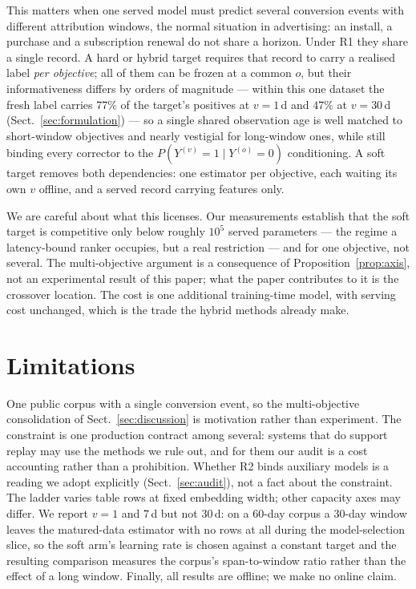 \documentclass[runningheads]{llncs}
\newcommand{\Yo}{Y^{(o)}}
\newcommand{\Yv}{Y^{(v)}}
\begin{document}
This matters when one served model must predict several conversion events with different
attribution windows, the normal situation in advertising: an install, a purchase and a subscription
renewal do not share a horizon. Under R1 they share a single record. A hard or hybrid target
requires that record to carry a realised label \emph{per objective}; all of them can be frozen at a
common $o$, but their informativeness differs by orders of magnitude --- within this one dataset the
fresh label carries $77\%$ of the target's positives at $v=1$\,d and $47\%$ at $v=30$\,d
(Sect.~\ref{sec:formulation}) --- so a single shared observation age is well matched to short-window
objectives and nearly vestigial for long-window ones, while still binding every corrector to the
$P(\Yv{=}1 \mid \Yo{=}0)$ conditioning. A soft target removes both dependencies: one estimator per
objective, each waiting its own $v$ offline, and a served record carrying features only.

We are careful about what this licenses. Our measurements establish that the soft target is
competitive only below roughly $10^{5}$ served parameters --- the regime a latency-bound ranker
occupies, but a real restriction --- and for one objective, not several. The multi-objective
argument is a consequence of Proposition~\ref{prop:axis}, not an experimental result of this paper;
what the paper contributes to it is the crossover location. The cost is one additional
training-time model, with serving cost unchanged, which is the trade the hybrid methods already
make.

\section{Limitations}\label{sec:limits}

One public corpus with a single conversion event, so the multi-objective consolidation of
Sect.~\ref{sec:discussion} is motivation rather than experiment. The constraint is one production
contract among several: systems that do support replay may use the methods we rule out, and for them
our audit is a cost accounting rather than a prohibition. Whether R2 binds auxiliary models is a
reading we adopt explicitly (Sect.~\ref{sec:audit}), not a fact about the constraint. The ladder
varies table rows at fixed embedding width; other capacity axes may differ. We report $v=1$ and
$7$\,d but not $30$\,d: on a 60-day corpus a 30-day window leaves the matured-data estimator with no
rows at all during the model-selection slice, so the soft arm's learning rate is chosen against a
constant target and the resulting comparison measures the corpus's span-to-window ratio rather than
the effect of a long window. Finally, all results are offline; we make no online claim.
\end{document}
